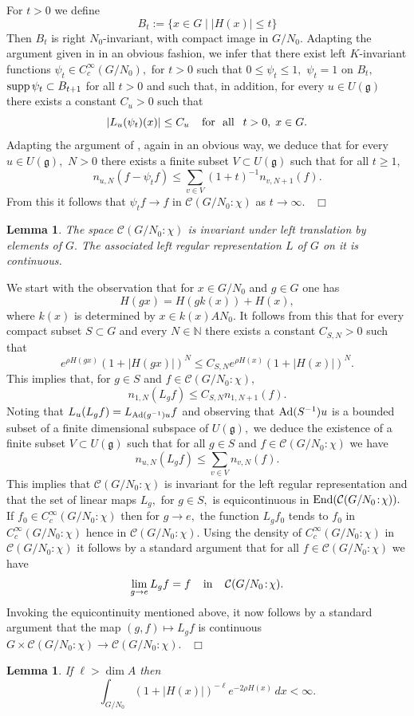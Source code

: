 \documentclass[12pt,a4paper]{article}
\newtheorem{Lemma}[Thm]{Lemma}
\newenvironment{lemma}[0]{\begin{Lemma}\noindent}%
{\end{Lemma}}
\def\proof{\par\noindent{\it Proof.}{\ }{\ }}
\def\qed{~\hfill\hbox{$\Box$}\medbreak}
\def\text#1{\;\;\;\;{\rm \hbox{#1}}\;\;\;\;}
\def\msy#1{{\mathbb #1}}
\def\N{{\msy N}}
\def\got#1{\mathfrak #1}
\def\fg{{\got g}}
\def\to{\rightarrow}
\def\Ad{{\rm Ad}}
\def\End{{\rm End}}
\def\cC{{\mathcal C}}
\numberwithin{Thm}{section}
\numberwithin{equation}{section}
\def\supp{{\rm supp}}
\numberwithin{equation}{section}
\def\col{\!:\!}
\def\cchi{\chi}
\begin{document}
\proof
For $t >0$ we define 
$$ 
B_t:= \{x \in G\mid |H(x)| \leq t\}
$$%
Then $B_t$ is right $N_0$-invariant, with compact image in $G/N_0.$ 
Adapting the argument given in \cite[p.~343, Lemma 1]{VarHA} in an obvious fashion,
we infer that there exist left $K$-invariant
functions $\psi_t \in C_c^\infty(G/N_0),$ for $t> 0$ such that 
$0\leq \psi_t \leq 1,$ $\psi_t = 1$ on $B_t,$ 
$\supp \,\psi_t \subset B_{t+1}$ for all $t > 0$ and such that, in addition, 
for every $u \in U(\fg)$ there exists a constant $C_u > 0$ such that 
$$ 
|L_u(\psi_t)(x)| \leq C_u  \text{for {\ }all}\!\! t  > 0,\; x \in G. 
$$%
Adapting the argument of \cite[p.~343, Thm.\ 2]{VarHA}, again in an obvious way, 
we deduce that
for every $u \in U(\fg),$ $N > 0$ there exists a finite subset 
$V \subset U(\fg)$ such that for all $t \geq 1,$ 
$$ 
n_{u,N}(f - \psi_t f) \leq \sum_{v \in V} (1 + t)^{-1} n_{v, N+1} (f).
$$%
From this it follows that $\psi_t f \to f$ in $\cC(G/N_0\col \cchi) $ as $t \to 
\infty$. 
\qed


\begin{lemma}
The space $\cC(G/N_0\col \cchi)$ is invariant under left translation by elements
of $G.$ The associated left regular representation $L$ of $G$ on it is continuous.
\end{lemma}

\proof
We start with the observation that for $x\in G/N_0$ and $g \in G$ one has
$$ 
H(g x) = H(g k(x)) + H(x),
$$%
where $k(x)$ is determined by $x \in k(x)AN_0.$ 
It follows from this that for every compact subset $S \subset G$ and every $N \in \N$ 
there exists a 
constant $C_{S,N} > 0$ such that 
$$ 
e^{\rho H(gx)} (1 + |H(gx)|)^N \leq C_{S, N} e^{\rho H(x)}(1 + |H(x)|)^N.
$$%
This implies that, for $g \in S$ and $f \in \cC(G/N_0\col \cchi),$
$$
n_{1, N} (L_g f) \leq C_{S,N} n_{1, N+1}(f).
$$%
Noting that $L_u (L_g f) = L_{\Ad(g^{-1}) u} f$ and observing that $\Ad(S^{-1}) u$ 
is a bounded subset of a finite dimensional subspace of $U(\fg),$ 
we deduce the existence of a finite subset $V \subset U(\fg)$ such that for all
 $g \in S$ and $f \in \cC(G/N_0\col \cchi)$ we have
 $$ 
 n_{u, N} (L_g f) \leq \sum_{v \in V} n_{v, N}(f).
 $$%
 This implies that $\cC(G/N_0\col \cchi)$ is invariant for the left regular representation 
 and that the set of linear maps $L_g,$ for $g\in S,$ is equicontinuous
  in $\End(\cC(G/N_0\col \cchi)).$ If $f_0 \in C_c^\infty(G/N_0\col \cchi)$ 
 then for $g \to e,$ the function $L_g f_0$ tends to $f_0$ in $C_c^\infty(G/N_0\col \cchi)$
 hence in $\cC(G/N_0\col \cchi).$ Using the density of $C_c^\infty(G/N_0\col \cchi)$ 
 in $\cC(G/N_0\col \cchi)$ it follows by a standard argument that for all $f \in \cC(G/N_0\col \cchi)$ we have 
 $$
 \lim_{g \to e} L_g f = f \text{in} \cC(G/N_0\col \cchi).
 $$%
Invoking the equicontinuity mentioned above, it now follows by a 
standard argument that the map $(g,f)\mapsto L_g f$ is continuous
$G \times \cC(G/N_0\col \cchi) \to \cC(G/N_0\col \cchi).$
\qed
\begin{lemma}
\label{l: convergence integral over G/N_0}
If $\ell > \dim A$ then
$$ 
\int_{G/N_0} (1 + |H(x)|)^{-\ell} e^{- 2 \rho H(x)} \, dx < \infty.
$$ 
\end{lemma}
\end{document}
